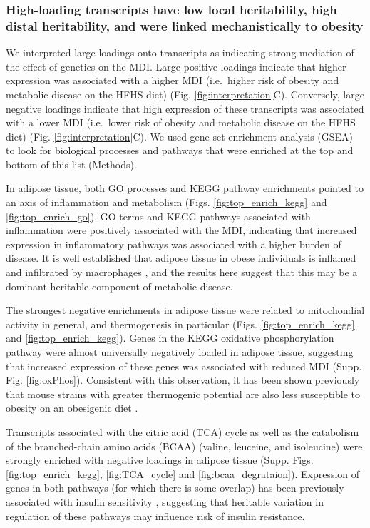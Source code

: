 \documentclass[
]{article}
\begin{document}
\subsubsection{High-loading transcripts have low local heritability,
high distal heritability, and were linked mechanistically to
obesity}\label{high-loading-transcripts-have-low-local-heritability-high-distal-heritability-and-were-linked-mechanistically-to-obesity}

We interpreted large loadings onto transcripts as indicating strong
mediation of the effect of genetics on the MDI. Large positive loadings
indicate that higher expression was associated with a higher MDI
(i.e.~higher risk of obesity and metabolic disease on the HFHS diet)
(Fig. \ref{fig:interpretation}C). Conversely, large negative loadings
indicate that high expression of these transcripts was associated with a
lower MDI (i.e.~lower risk of obesity and metabolic disease on the HFHS
diet) (Fig. \ref{fig:interpretation}C). We used gene set enrichment
analysis (GSEA) \cite{fgsea, 
pmid16199517} to look for biological processes and pathways that were
enriched at the top and bottom of this list (Methods).

In adipose tissue, both GO processes and KEGG pathway enrichments
pointed to an axis of inflammation and metabolism (Figs.
\ref{fig:top_enrich_kegg} and \ref{fig:top_enrich_go}). GO terms and
KEGG pathways associated with inflammation were positively associated
with the MDI, indicating that increased expression in inflammatory
pathways was associated with a higher burden of disease. It is well
established that adipose tissue in obese individuals is inflamed and
infiltrated by macrophages \cite{pmid19133410, 
pmid28955384, pmid28912810, pmid28901330, pmid24969772}, and the results
here suggest that this may be a dominant heritable component of
metabolic disease.

The strongest negative enrichments in adipose tissue were related to
mitochondial activity in general, and thermogenesis in particular (Figs.
\ref{fig:top_enrich_kegg} and \ref{fig:top_enrich_kegg}). Genes in the
KEGG oxidative phosphorylation pathway were almost universally
negatively loaded in adipose tissue, suggesting that increased
expression of these genes was associated with reduced MDI (Supp. Fig.
\ref{fig:oxPhos}). Consistent with this observation, it has been shown
previously that mouse strains with greater thermogenic potential are
also less susceptible to obesity on an obesigenic diet
\cite{pmid18492779}.

Transcripts associated with the citric acid (TCA) cycle as well as the
catabolism of the branched-chain amino acids (BCAA) (valine, leuceine,
and isoleucine) were strongly enriched with negative loadings in adipose
tissue (Supp. Figs. \ref{fig:top_enrich_kegg}, \ref{fig:TCA_cycle} and
\ref{fig:bcaa_degrataion}). Expression of genes in both pathways (for
which there is some overlap) has been previously associated with insulin
sensitivity \cite{pmid29567659, 
pmid22560213, pmid19841271}, suggesting that heritable variation in
regulation of these pathways may influence risk of insulin resistance.
\end{document}
